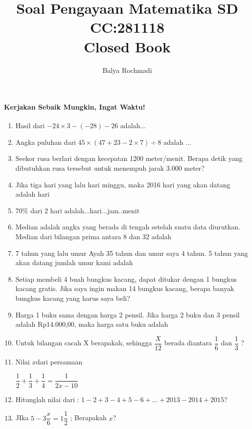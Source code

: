 \documentclass[12pt,a4paper,draft,final,oneside,twoside,openright,openany]{article}
\author{Balya Rochmadi}
\title{Soal Pengayaan Matematika SD \\CC:281118 \\
	Closed Book}
\begin{document}
	\maketitle
	\Large
	\noindent\makebox[\linewidth]{\rule{\paperwidth}{0.4pt}}
	\paragraph{Kerjakan Sebaik Mungkin, Ingat Waktu!}
	\begin{enumerate}
		\item Hasil dari $-24\times 3-(-28)-26$ adalah...
		\item Angka puluhan dari $45\times(47+23-2 \times 7)\div 8$ adalah ...
		\item Seekor rusa berlari dengan kecepatan 1200 meter/menit. Berapa detik yang dibutuhkan rusa tersebut untuk menempuh jarak 3.000 meter?
		\item Jika tiga hari yang lalu hari minggu, maka 2016 hari yang akan datang adalah hari \item 70$\%$ dari 2 hari adalah...hari...jam..menit
		\item Median adalah angka yang berada di tengah setelah suatu data diurutkan. Median dari bilangan prima antara 8 dan 32 adalah 
		\item 7 tahun yang lalu umur Ayah 35 tahun dan umur saya 4 tahun. 5 tahun yang akan datang jumlah umur kami adalah 
		\item Setiap membeli 4 buah bungkus kacang, dapat ditukar dengan 1 bungkus kacang gratis. Jika saya ingin makan 14 bungkus kacang, berapa banyak bungkus kacang yang harus saya beli?
		\item Harga 1 buku sama dengan harga 2 pensil. Jika harga 2 buku dan 3 pensil adalah Rp14.000,00, maka harga satu buku adalah 
		\item Untuk bilangan cacah X  berapakah, sehingga $\dfrac{X}{12}$ berada diantara $\dfrac{1}{6}$  dan $\dfrac{1}{3}$ ?
		 \item Nilai $x$dari persamaan
			\begin{center}
				$\dfrac{1}{2}+\dfrac{1}{3}+\dfrac{1}{4}=\dfrac{1}{2x-10}$
			\end{center}
	 
	 
	 
	 \item Hitunglah nilai dari : $1-2+3-4+5-6+...+2013-2014+2015$?
	 
	 \item JIka $5-3\dfrac{x}{6}=1\dfrac{1}{2}$ ; Berapakah $x$?
	 

\end{enumerate}
\end{document}
